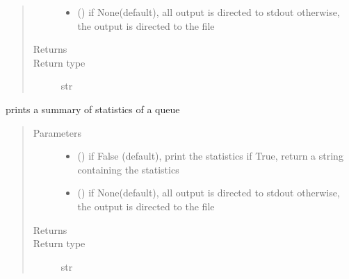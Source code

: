 \documentclass[letterpaper,10pt,english]{sphinxmanual}
\begin{document}
\begin{fulllineitems}
\begin{fulllineitems}
\begin{quote}
\begin{description}
\begin{itemize}
\item {} 
 () \textendash{} if None(default), all output is directed to stdout 
otherwise, the output is directed to the file

\end{itemize}

\item[{Returns}] \leavevmode
{}

\item[{Return type}] \leavevmode
str

\end{description}\end{quote}

\end{fulllineitems}


\begin{fulllineitems}
\label{\detokenize{Reference:salabim.Queue.print_statistics}}
prints a summary of statistics of a queue
\begin{quote}\begin{description}
\item[{Parameters}] \leavevmode\begin{itemize}
\item {} 
 () \textendash{} if False (default), print the statistics
if True, return a string containing the statistics

\item {} 
 () \textendash{} if None(default), all output is directed to stdout 
otherwise, the output is directed to the file

\end{itemize}

\item[{Returns}] \leavevmode
{}

\item[{Return type}] \leavevmode
str

\end{description}\end{quote}


\end{fulllineitems}
\end{fulllineitems}
\end{document}
